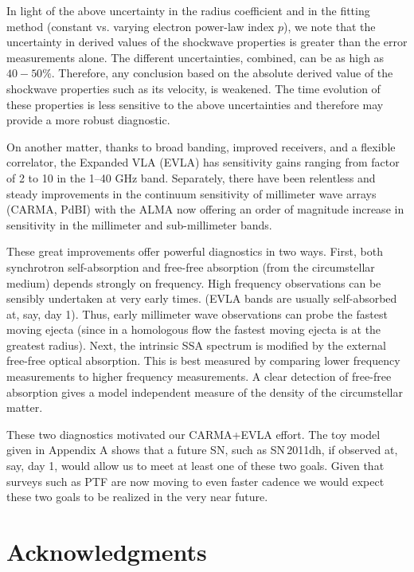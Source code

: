 \documentclass{emulateapj}
\begin{document}
In light of the above uncertainty in the
radius coefficient and in the fitting method
(constant vs. varying electron power-law index $p$), we note that the uncertainty
in derived values of the shockwave properties is greater than the
error measurements alone. The different uncertainties, combined, can
be as high as $40-50 \%$. Therefore, any conclusion based on the
absolute derived value of the shockwave properties such as its
velocity, is weakened. The time evolution of these properties is less
sensitive to the above uncertainties and therefore may provide a more
robust diagnostic. 



On another matter, thanks to broad banding, 
improved receivers, and a flexible correlator, the Expanded VLA (EVLA) has
sensitivity gains ranging from factor of 2 to 10 in the 1--40 GHz band. 
Separately, there have been relentless and steady improvements in the
continuum sensitivity of millimeter wave arrays (CARMA, PdBI) with the
ALMA now offering an order of magnitude increase in sensitivity in the 
millimeter and sub-millimeter bands. 

These great improvements offer powerful diagnostics in two ways. First, 
both synchrotron self-absorption and free-free absorption (from the circumstellar
medium) depends strongly on frequency. 
High frequency observations can be sensibly undertaken at very early times.
(EVLA bands are usually self-absorbed at, say, day 1). Thus, early millimeter
wave observations can probe the fastest moving ejecta (since in a homologous
flow the fastest moving ejecta is at the greatest radius). Next, the intrinsic
SSA spectrum is modified by the external free-free optical absorption. This is
best measured by comparing lower frequency measurements to higher frequency
measurements. A clear detection of free-free absorption gives a model independent
measure of the density of the circumstellar matter. 

These two diagnostics motivated our CARMA+EVLA effort. 
The toy model given in Appendix A shows that a future
SN, such as SN\,2011dh, if observed at, say, day 1, would allow us to meet at least one of
these two goals. Given that surveys such as PTF are now moving to even
faster cadence we would expect these two goals to be realized in the very
near future.


\section*{Acknowledgments}
\end{document}
